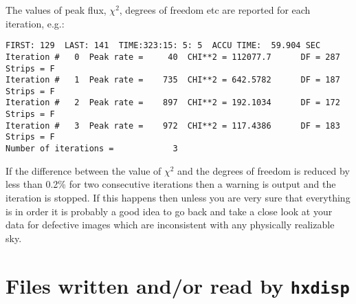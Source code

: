 The values of peak flux, $\chi^2$, degrees of freedom etc are reported
for each iteration, e.g.:
\begin{verbatim}
FIRST: 129  LAST: 141  TIME:323:15: 5: 5  ACCU TIME:  59.904 SEC
Iteration #   0  Peak rate =     40  CHI**2 = 112077.7      DF = 287  Strips = F
Iteration #   1  Peak rate =    735  CHI**2 = 642.5782      DF = 187  Strips = F
Iteration #   2  Peak rate =    897  CHI**2 = 192.1034      DF = 172  Strips = F
Iteration #   3  Peak rate =    972  CHI**2 = 117.4386      DF = 183  Strips = F
Number of iterations =            3
\end{verbatim}

If the difference between the value of $\chi^2$ and the degrees of freedom is
reduced by less than 0.2\% for two consecutive iterations then a warning is
output and the iteration is stopped.
If this happens then unless you are very sure that everything is in order it is
probably a good idea to go back and take a close look at your data for
defective images which are inconsistent with any physically realizable sky.


\section{Files written and/or read by {\tt hxdisp}}
\label{FILES}

